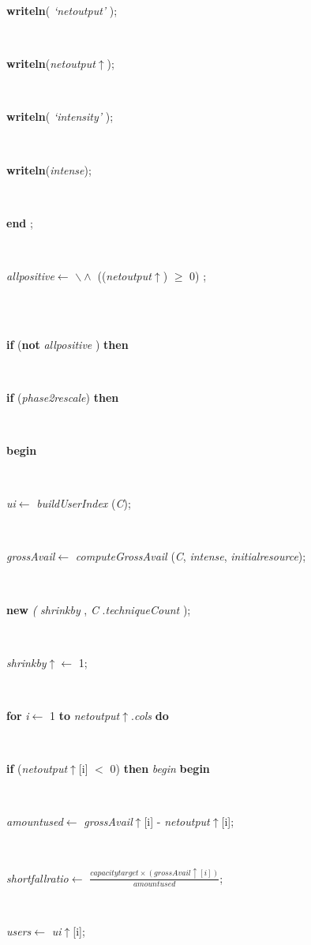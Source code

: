 \begin{tabbing}
\parbox{14cm}{\textsf{\textbf{writeln}(\textit{\textrm{\textup { `netoutput' } }})}; }\\
\parbox{14cm}{\textsf{\textbf{writeln}(\textit{netoutput}$\uparrow$\textit{})}; }\\
\parbox{14cm}{\textsf{\textbf{writeln}(\textit{\textrm{\textup { `intensity' } }})}; }\\
\parbox{14cm}{\textsf{\textbf{writeln}(\textit{intense})}; }\\
\<\-\parbox{14cm}{\textsf{\textbf{end} ;}}\\
\parbox{14cm}{\textsf{\textit{allpositive}$\leftarrow$ \textbf{ $\backslash \wedge$  } ((\textit{netoutput}$\uparrow$\textit{}) $\geq$ 0) }; }\\
\\
\+\parbox{14cm}{\textsf {\textbf {if } \textsf{(\textbf{not} \textit{allpositive} )} \textbf{ then } }}\\
\+\parbox{14cm}{\textsf {\textbf {if } \textsf{(\textit{phase2rescale})} \textbf{ then } }}\\
\<\parbox{14cm}{\textsf{\textbf{begin} }}\\
\parbox{14cm}{\textsf{\textit{ui}$\leftarrow$ \textit{buildUserIndex} (\textit{C})}; }\\
\parbox{14cm}{\textsf{\textit{grossAvail}$\leftarrow$ \textit{computeGrossAvail} (\textit{C}, \textit{intense}, \textit{initialresource})}; }\\
\parbox{14cm}{\textsf{\textbf{new} \textit{(} \textit{shrinkby} , \textit{C} .\textit{techniqueCount} );}}\\
\parbox{14cm}{\textsf{\textit{shrinkby}$\uparrow$\textit{}$\leftarrow$ 1}; }\\
\+\parbox{14cm}{\textsf {\textbf {for } \textsf{\textit{i}$\leftarrow$ 1} \textbf{ to } \textsf{\textit{netoutput}$\uparrow$.\textit{cols}} \textbf{ do } }}\\
\+\<\parbox{14cm}{\textsf {\textbf {if } \textsf{(\textit{netoutput}$\uparrow$\textit{}[i] $<$ 0)} \textbf{ then } \textsf{\textit{begin}} \textbf{ begin } }}\\
\parbox{14cm}{\textsf{\textit{amountused}$\leftarrow$ \textit{grossAvail}$\uparrow$\textit{}[i] - \textit{netoutput}$\uparrow$\textit{}[i]}; }\\
\parbox{14cm}{\textsf{\textit{shortfallratio}$\leftarrow$ $\frac{\textit{capacitytarget} \times (\textit{grossAvail}\uparrow\textit{}[\textit{i}])}{\textit{amountused}}$}; }\\
\parbox{14cm}{\textsf{\textit{users}$\leftarrow$ \textit{ui}$\uparrow$\textit{}[i]}; }\\
\end{tabbing}
